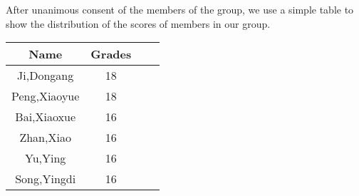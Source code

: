 \noindent After unanimous consent of the members of the group, we use a simple table to show the distribution of the scores of members in our group.

\begin{center}
    

\begin{table}[h]
\centering
\begin{tabular}{ccll}
\rowcolor[HTML]{FD6864} 
{\color[HTML]{333333} Name} & {\color[HTML]{333333} Grades} \\ \hline
Ji,Dongang                  & 18                            \\ \hline
Peng,Xiaoyue                & 18                            \\ \hline
Bai,Xiaoxue                 & 16                            \\ \hline
Zhan,Xiao                   & 16                            \\ \hline
Yu,Ying                     & 16                            \\ \hline
Song,Yingdi                 & 16                            \\ \hline
\end{tabular}
\end{table}
\end{center}